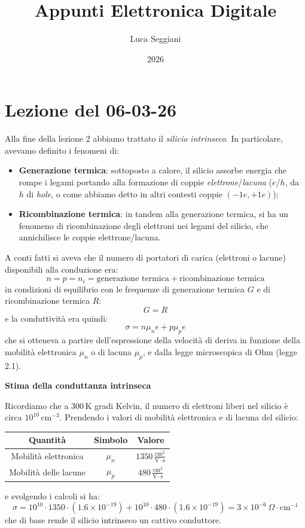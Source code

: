 \documentclass[a4paper,11pt]{article}
\title{Appunti Elettronica Digitale}
\author{Luca Seggiani}
\date{2026}
\begin{document}
\section{Lezione del 06-03-26}

\thispagestyle{empty}
\pagestyle{fancy}

Alla fine della lezione 2 abbiamo trattato il \textit{silicio intrinseco}. In particolare, avevamo definito i fenomeni di:
\begin{itemize}
	\item \textbf{Generazione termica}: sottoposto a calore, il silicio assorbe energia che rompe i legami portando alla formazione di coppie \textit{elettrone}/\textit{lacuna} ($e$/$h$, da $h$ di \textit{hole}, o come abbiamo detto in altri contesti coppie $(-1 e, +1 e)$);
	\item \textbf{Ricombinazione termica}: in tandem alla generazione termica, si ha un fenomeno di ricombinazione degli elettroni nei legami del silicio, che annichilisce le coppie elettrone/lacuna. 
\end{itemize}

A conti fatti si aveva che il numero di portatori di carica (elettroni o lacune) disponibili alla conduzione era:
$$
n = p = n_i = \text{generazione termica} + \text{ricombinazione termica}
$$
in condizioni di equilibrio con le frequenze di generazione termica $G$ e di ricombinazione termica $R$:
$$
G = R
$$
e la conduttività era quindi:
$$
\sigma = n \mu_n e + p \mu_p e
$$
che si otteneva a partire dell'espressione della velocità di deriva in funzione della mobilità elettronica $\mu_n$ o di lacuna $\mu_p$, e dalla legge microscopica di Ohm (legge 2.1).

\par\smallskip

\noindent
\textbf{\textsf{Stima della conduttanza intrinseca}}

\noindent
Ricordiamo che a $300 \, \mathrm{K}$ gradi Kelvin, il numero di elettroni liberi nel silicio è circa $10^{10} \, \mathrm{cm}^{-3}$. Prendendo i valori di mobilità elettronica e di lacuna del silicio:
\begin{table}[H]
	\center {}
	\begin{tabular} { c | c | c  }
		\bfseries Quantità & \bfseries Simbolo & \bfseries Valore \\
		\hline 
		Mobilità elettronica & $\mu_n$ & $1350  \, \frac{\mathrm{cm}^2}{\mathrm{V} \cdot \mathrm{s}}$ \\
		Mobilità delle lacune & $\mu_p$ & $480  \, \frac{\mathrm{cm}^2}{\mathrm{V} \cdot \mathrm{s}}$
	\end{tabular}
\end{table}
e svolgendo i calcoli si ha:
$$
\sigma = 10^{10} \cdot 1350 \cdot (1.6 \times 10^{-19}) + 10^{10} \cdot 480 \cdot (1.6 \times 10^{-19}) = 3 \times 10^{-6} \, \Omega \cdot \mathrm{cm}^{-1}
$$
che di base rende il silicio intrinseco un cattivo conduttore.
\end{document}
